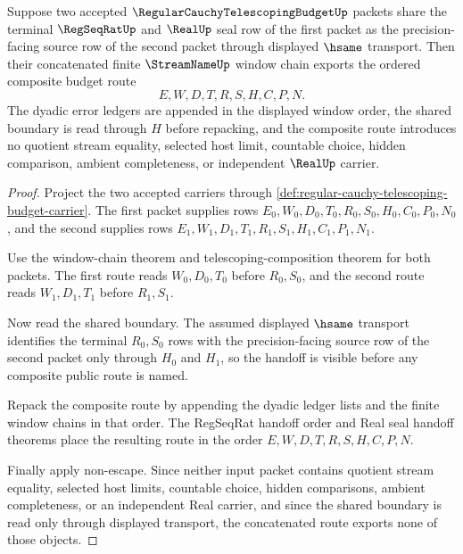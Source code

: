 \begin{theorem}
\label{thm:regular-cauchy-telescoping-budget-window-concatenation-route}
Suppose two accepted $\RegularCauchyTelescopingBudgetUp$ packets share the terminal $\RegSeqRatUp$ and $\RealUp$ seal row of the first packet as the precision-facing source row of the second packet through displayed $\hsame$ transport. Then their concatenated finite $\StreamNameUp$ window chain exports the ordered composite budget route
$$
E,W,D,T,R,S,H,C,P,N.
$$
The dyadic error ledgers are appended in the displayed window order, the shared boundary is read through $H$ before repacking, and the composite route introduces no quotient stream equality, selected host limit, countable choice, hidden comparison, ambient completeness, or independent $\RealUp$ carrier.
\end{theorem}
\begin{proof}
Project the two accepted carriers through \autoref{def:regular-cauchy-telescoping-budget-carrier}. The first packet supplies rows $E_0,W_0,D_0,T_0,R_0,S_0,H_0,C_0,P_0,N_0$, and the second supplies rows $E_1,W_1,D_1,T_1,R_1,S_1,H_1,C_1,P_1,N_1$.

Use the window-chain theorem and telescoping-composition theorem for both packets. The first route reads $W_0,D_0,T_0$ before $R_0,S_0$, and the second route reads $W_1,D_1,T_1$ before $R_1,S_1$.

Now read the shared boundary. The assumed displayed $\hsame$ transport identifies the terminal $R_0,S_0$ rows with the precision-facing source row of the second packet only through $H_0$ and $H_1$, so the handoff is visible before any composite public route is named.

Repack the composite route by appending the dyadic ledger lists and the finite window chains in that order. The RegSeqRat handoff order and Real seal handoff theorems place the resulting route in the order $E,W,D,T,R,S,H,C,P,N$.

Finally apply non-escape. Since neither input packet contains quotient stream equality, selected host limits, countable choice, hidden comparisons, ambient completeness, or an independent Real carrier, and since the shared boundary is read only through displayed transport, the concatenated route exports none of those objects.
\end{proof}

